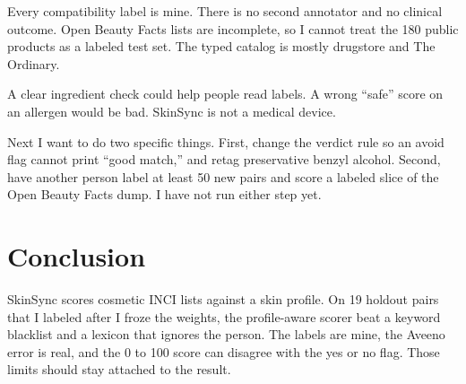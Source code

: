 \documentclass[conference]{IEEEtran}
\begin{document}
Every compatibility label is mine. There is no second annotator and no clinical outcome. Open Beauty Facts lists are incomplete, so I cannot treat the 180 public products as a labeled test set. The typed catalog is mostly drugstore and The Ordinary.

A clear ingredient check could help people read labels. A wrong ``safe'' score on an allergen would be bad. SkinSync is not a medical device.

Next I want to do two specific things. First, change the verdict rule so an avoid flag cannot print ``good match,'' and retag preservative benzyl alcohol. Second, have another person label at least 50 new pairs and score a labeled slice of the Open Beauty Facts dump. I have not run either step yet.

\section{Conclusion}
SkinSync scores cosmetic INCI lists against a skin profile. On 19 holdout pairs that I labeled after I froze the weights, the profile-aware scorer beat a keyword blacklist and a lexicon that ignores the person. The labels are mine, the Aveeno error is real, and the 0 to 100 score can disagree with the yes or no flag. Those limits should stay attached to the result.
\end{document}
